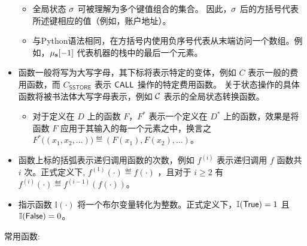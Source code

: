 \begin{itemize}[nosep]
	\begin{itemize}[nosep]
		\item 全局状态 $\mathbf{\sigma}$ 可被理解为多个键值组合的集合。
		因此，$\mathbf{\sigma}$ 后的方括号代表所述键相应的值（例如，账户地址）。
		
		\item 与Python语法相同，在方括号内使用负序号代表从末端访问一个数组。例如，$\mathbf{\mu}_{\mathbf{s}}[-1]$ 代表机器的栈中的最后一个元素。
	\end{itemize}
	
	
	\item 函数一般将写为大写字母，其下标将表示特定的变体，例如 $C$ 表示一般的费用函数，而 $C_{\mathsf{SSTORE}}$ 表示 $\mathsf{CALL}$ 操作的特定费用函数。
	关于状态操作的具体函数将被书法体大写字母表示，例如 $\mathcal{C}$ 表示{\name}的全局状态转换函数。
	
	\begin{itemize}[nosep]
		\item 对于定义在 $D$ 上的函数 $F$，$F^*$ 表示一个定义在 $D^*$ 上的函数，效果是将函数 $F$ 应用于其输入的每一个元素之中，换言之 $F^*\big( \left(x_1, x_2, \dots\right) \big) \eqdef \left( F(x_1), F(x_2),\dots \right)$。
	\end{itemize}
	
	
	\item 函数上标的括弧表示递归调用函数的次数，例如 $f^{(i)}$ 表示递归调用 $f$ 函数共 $i$ 次。正式定义下, $f^{(1)}(\cdot)\eqdef f(\cdot)$ ，且对于 $i\ge 2$ 有 $f^{(i)}(\cdot)\eqdef f^{(i-1)}(f(\cdot))$。
	
	
	\item 指示函数 $\mathbb{I}(\cdot)$ 将一个布尔变量转化为整数。正式定义下，$\mathbb{I}(\mathsf{True})=1$ 且 $\mathbb{I}(\mathsf{False})=0$。
	
\end{itemize}  

\smallskip

常用函数:

